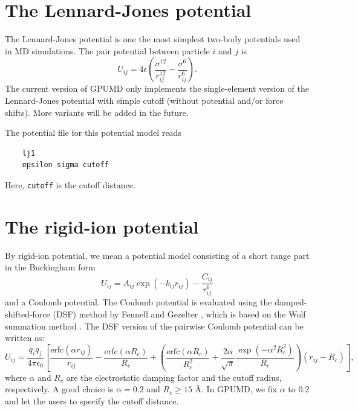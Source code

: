 \documentclass[12pt,a4paper]{report}
\begin{document}
\section{The Lennard-Jones potential}

The Lennard-Jones potential is one the most simplest two-body potentials used in MD simulations. The pair potential between particle $i$ and $j$ is
\begin{equation}
U_{ij} = 4 \epsilon
\left(
\frac{ \sigma^{12} }{ r_{ij}^{12} } -
\frac{\sigma^{6} }{ r_{ij}^{6} }
\right).
\end{equation}
The current version of GPUMD only implements the single-element version of the Lennard-Jones potential with simple cutoff (without potential and/or force shifts). More variants will be added in the future.

The potential file for this potential model reads
\begin{verbatim}
    lj1
    epsilon sigma cutoff
\end{verbatim}
Here, \verb"cutoff" is the cutoff distance.

\section{The rigid-ion potential}

By rigid-ion potential, we mean a potential model consisting of a short range part in the Buckingham form
\begin{equation}
U_{ij} = A_{ij} \exp\left( - b_{ij} r_{ij} \right)
- \frac{C_{ij} }{ r_{ij}^{6} }
\end{equation}
and a Coulomb potential. The Coulomb potential is evaluated using the damped-shifted-force (DSF) method by Fennell and Gezelter \cite{fennell2006jcp}, which is based on the Wolf summation method \cite{wolf1999jcp}. The DSF version of the pairwise Coulomb potential can be written as:
\begin{equation}
U_{ij} = \frac{q_iq_j}{4\pi\epsilon_0}
\left[
\frac{\text{erfc}(\alpha r_{ij})}{r_{ij}} -
\frac{\text{erfc}(\alpha R_{c})}{R_{c}} +
  \left(
    \frac{\text{erfc}(\alpha R_{c})}{R_{c}^2} +
    \frac{2\alpha}{\sqrt{\pi}}
    \frac{\exp(-\alpha^2R_c^2)}{R_{c}}
  \right) (r_{ij} - R_c)
\right],
\end{equation}
where $\alpha$ and $R_c$ are the electrostatic damping factor and the cutoff radius, respectively.
A good choice is $\alpha=0.2$ and $R_c \geq 15$ \AA. In GPUMD, we fix $\alpha$  to 0.2 and let the users to specify the cutoff distance.
\end{document}
